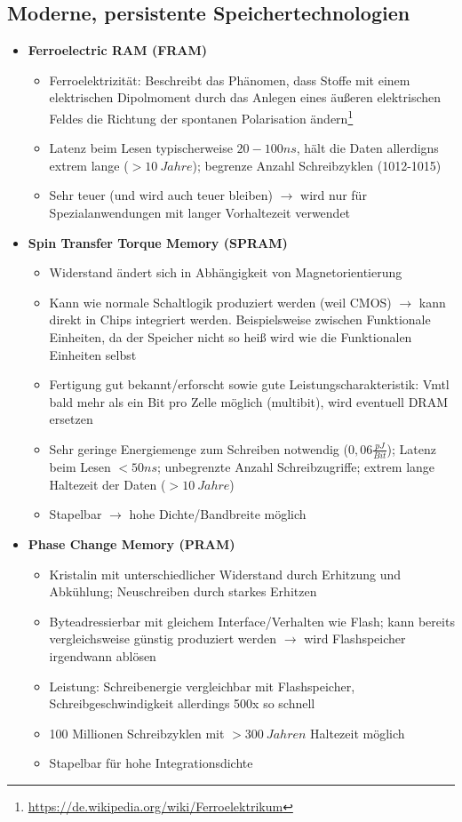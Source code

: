 \subsection{Moderne, persistente Speichertechnologien}
\begin{itemize}
	\item \textbf{Ferroelectric RAM (FRAM)}
	\begin{itemize}
		\item Ferroelektrizität: Beschreibt das Phänomen, dass Stoffe mit einem elektrischen Dipolmoment durch das Anlegen eines äußeren elektrischen Feldes die Richtung der spontanen Polarisation ändern\footnote{\url{https://de.wikipedia.org/wiki/Ferroelektrikum}}
		\item Latenz beim Lesen typischerweise \(20-100ns\), hält die Daten allerdigns extrem lange (\(>10~Jahre\)); begrenze Anzahl Schreibzyklen (1012-1015)
		\item Sehr teuer (und wird auch teuer bleiben) \(\rightarrow\) wird nur für Spezialanwendungen mit langer Vorhaltezeit verwendet
	\end{itemize}
	\item \textbf{Spin Transfer Torque Memory (SPRAM)}
	\begin{itemize}
		\item Widerstand ändert sich in Abhängigkeit von Magnetorientierung
		\item Kann wie normale Schaltlogik produziert werden (weil CMOS) \(\rightarrow\) kann direkt in Chips integriert werden. Beispielsweise zwischen Funktionale Einheiten, da der Speicher nicht so heiß wird wie die Funktionalen Einheiten selbst
		\item Fertigung gut bekannt/erforscht sowie gute Leistungscharakteristik: Vmtl bald mehr als ein Bit pro Zelle möglich (multibit), wird eventuell DRAM ersetzen
		\item Sehr geringe Energiemenge zum Schreiben notwendig (\(0,06\frac{pJ}{Bit}\)); Latenz beim Lesen \(< 50ns\); unbegrenzte Anzahl Schreibzugriffe; extrem lange Haltezeit der Daten (\(>10~Jahre\))
		\item Stapelbar \(\rightarrow\) hohe Dichte/Bandbreite möglich
	\end{itemize}
	\item \textbf{Phase Change Memory (PRAM)}
	\begin{itemize}
		\item Kristalin mit unterschiedlicher Widerstand durch Erhitzung und Abkühlung; Neuschreiben durch starkes Erhitzen
		\item Byteadressierbar mit gleichem Interface/Verhalten wie Flash; kann bereits vergleichsweise günstig produziert werden \(\rightarrow\) wird Flashspeicher irgendwann ablösen
		\item Leistung: Schreibenergie vergleichbar mit Flashspeicher, Schreibgeschwindigkeit allerdings 500x so schnell
		\item 100 Millionen Schreibzyklen mit \(>300~Jahren\) Haltezeit möglich
		\item Stapelbar für hohe Integrationsdichte
	\end{itemize}
\end{itemize}



